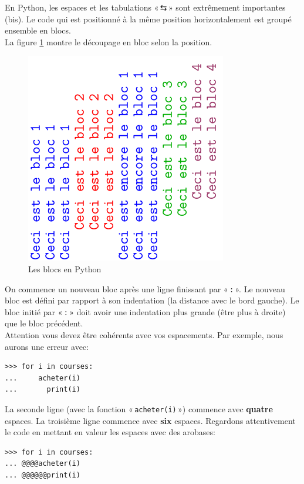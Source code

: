 En Python, les espaces et les tabulations « \textsf{⇆} » sont extrêmement  importantes (bis). Le code qui est positionné à la même position horizontalement est groupé ensemble en blocs.\\


La figure \ref{fig:blocs} montre le découpage en bloc selon la position.
\begin{figure}[H]
\centering
\includegraphics[scale=1,angle=270]{images/blocs.pdf}
\caption{Les blocs en Python}
\label{fig:blocs}
\end{figure}

On commence un nouveau bloc après une ligne finissant   par « \verb+:+ ». Le nouveau bloc est défini par rapport à son indentation (la distance avec le bord gauche). Le bloc initié par « \verb+:+ » doit avoir une indentation plus grande (être plus à droite) que le bloc précédent.\\


Attention vous devez être cohérents avec vos espacements. Par exemple, nous aurons une erreur avec:

\begin{Verbatim}[frame=single,rulecolor=\color{red}, label=erreur]
>>> for i in courses:
...     acheter(i)
...       print(i)
\end{Verbatim}

La seconde ligne (avec la fonction « \texttt{acheter(i)} ») commence avec \textbf{quatre} espaces. La troisième ligne commence avec \textbf{six} espaces. Regardons attentivement le code en mettant en valeur les espaces avec des arobases:

\begin{Verbatim}[frame=single,rulecolor=\color{gray}, label=ne pas saisir]
>>> for i in courses:
... @@@@acheter(i)
... @@@@@@print(i)
\end{Verbatim}


